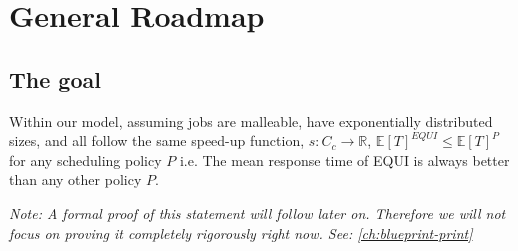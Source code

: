 \chapter{General Roadmap}\label{ch_roadmap}

\section{The goal}

\begin{theorem}
    \label{EQUI_optimal}\leanok
    Within our model, assuming jobs are malleable, have exponentially distributed sizes,
and all follow the same speed-up function, $s \colon C_c \to \mathbb{R}$, $\mathbb{E}[T]^{EQUI} \leq \mathbb{E}[T]^P$ for any scheduling policy $P$ i.e. The mean response time of EQUI is always better than any other policy $P$.
\end{theorem}
\emph{\noindent Note: A formal proof of this statement will follow later on. Therefore we will not focus on proving it completely rigorously right now. See: \ref{ch:blueprint-print}}
